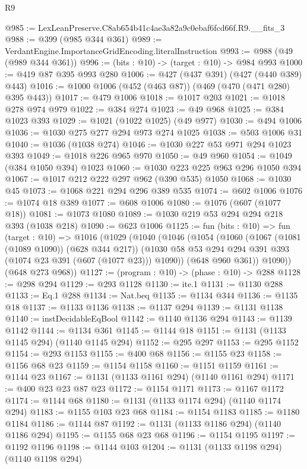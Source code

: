 \begin{lexlean}{R9}
\begin{coremodule}
@985 := LexLeanPreserve.C8ab654b41c4ae3a82a9c0ebaf6fcd66f.R9.__fits_3
@988 := @399 (@985 @344 @361)
@989 := VerdantEngine.ImportanceGridEncoding.literalInstruction
@993 := @988 (@49 (@989 @344 @361))
@996 := (bits : @10) -> (target : @10) -> @984 @993
@1000 := @419 @87 @395 @993 @280
@1006 := @427 (@437 @391) (@427 (@440 @389) @443)
@1016 := @1000 @1006 (@452 (@463 @87)) (@469 (@470 (@471 @280) @395 @443))
@1017 := @479 @1006
@1018 := @1017 @203
@1021 := @1018 @278 @974 @979
@1022 := @384 @274
@1023 := @49 @968
@1025 := @384 @1023 @393
@1029 := @1021 (@1022 @1025) (@49 @977)
@1030 := @494 @1006
@1036 := @1030 @275 @277 @294 @973 @274 @1025
@1038 := @503 @1006 @31
@1040 := @1036 (@1038 @274)
@1046 := @1030 @227 @53 @971 @294 @1023 @393
@1049 := @1018 @226 @965 @970
@1050 := @49 @960
@1054 := @1049 (@384 @1050 @394) @1023
@1060 := @1030 @223 @225 @963 @296 @1050 @394
@1067 := @1017 @212 @222 @297 @962 (@390 @535) @1050
@1068 := @1030 @45
@1073 := @1068 @221 @294 @296 @389 @535
@1074 := @602 @1006
@1076 := @1074 @18 @389
@1077 := @608 @1006
@1080 := @1076 (@607 (@1077 @18))
@1081 := @1073 @1080
@1089 := @1030 @219 @53 @294 @294 @218 @393 (@1038 @218)
@1090 := @623 @1006
@1125 := fun (bits : @10) =>
  fun (target : @10) =>
  @1016
    (@1029
      (@1040
        (@1046
          (@1054
            (@1060
              (@1067 (@1081 (@1089 @1090)) (@628 @344 @217))
              (@1030 @58 @53 @294 @294 @391 @393 (@1074 @23 @391 (@607 (@1077 @23))) @1090))
            (@648 @960 @361))
          @1090))
      (@648 @273 @968))
@1127 := (program : @10) -> (phase : @10) -> @288
@1128 := @298 @294
@1129 := @293 @1128
@1130 := ite.{1}
@1131 := @1130 @288
@1133 := Eq.{1} @288
@1134 := Nat.beq
@1135 := @1134 @344
@1136 := @1135 @18
@1137 := @1133 @1136
@1138 := @1137 @294
@1139 := @1131 @1138
@1140 := instDecidableEqBool
@1142 := @1140 @1136 @294
@1143 := @1139 @1142
@1144 := @1134 @361
@1145 := @1144 @18
@1151 := @1131 (@1133 @1145 @294) (@1140 @1145 @294)
@1152 := @295 @297
@1153 := @295 @1152
@1154 := @293 @1153
@1155 := @400 @68
@1156 := @1155 @23
@1158 := @1156 @68 @23
@1159 := @1154 @1158
@1160 := @1151 @1159
@1161 := @1144 @23
@1167 := @1131 (@1133 @1161 @294) (@1140 @1161 @294)
@1171 := @400 @23 @23 @87 @23
@1172 := @1154 @1171
@1173 := @1167 @1172
@1174 := @1144 @68
@1180 := @1131 (@1133 @1174 @294) (@1140 @1174 @294)
@1183 := @1155 @103 @23 @68
@1184 := @1154 @1183
@1185 := @1180 @1184
@1186 := @1144 @87
@1192 := @1131 (@1133 @1186 @294) (@1140 @1186 @294)
@1195 := @1155 @68 @23 @68
@1196 := @1154 @1195
@1197 := @1192 @1196
@1198 := @1144 @103
@1204 := @1131 (@1133 @1198 @294) (@1140 @1198 @294)

\end{coremodule}
\end{lexlean}
